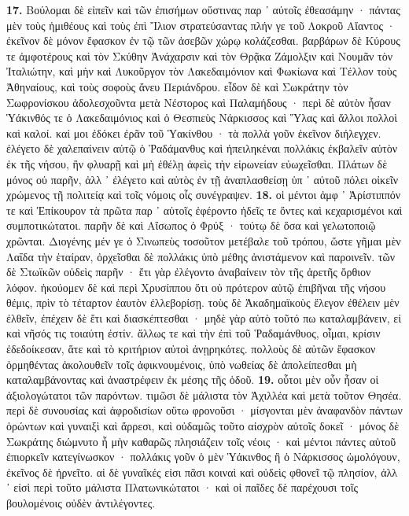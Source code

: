 \documentclass[a4paper, 11pt, oneside, polutonikogreek, german]{article}
\begin{document}
\textbf{17.} Βούλομαι δὲ εἰπεῖν καὶ τῶν ἐπισήμων οὕστινας παρ ᾽ αὐτοῖς ἐθεασάμην · πάντας μὲν τοὺς ἡμιθέους καὶ τοὺς ἐπὶ Ἴλιον στρατεύσαντας πλήν γε τοῦ Λοκροῦ Αἴαντος · ἐκεῖνον δὲ μόνον ἔφασκον ἐν τῷ τῶν ἀσεβῶν χώρῳ κολάζεσθαι. βαρβάρων δὲ Κύρους τε ἀμφοτέρους καὶ τὸν Σκύθην Ἀνάχαρσιν καὶ τὸν Θρᾷκα Ζάμολξιν καὶ Νουμᾶν τὸν Ἰταλιώτην, καὶ μὴν καὶ Λυκοῦργον τὸν Λακεδαιμόνιον καὶ Φωκίωνα καὶ Τέλλον τοὺς Ἀθηναίους, καὶ τοὺς σοφοὺς ἄνευ Περιάνδρου. εἶδον δὲ καὶ Σωκράτην τὸν Σωφρονίσκου ἀδολεσχοῦντα μετὰ Νέστορος καὶ Παλαμήδους · περὶ δὲ αὐτὸν ἦσαν Ὑάκινθός τε ὁ Λακεδαιμόνιος καὶ ὁ Θεσπιεὺς Νάρκισσος καὶ Ὕλας καὶ ἄλλοι πολλοὶ καὶ καλοί. καί μοι ἐδόκει ἐρᾶν τοῦ Ὑακίνθου · τὰ πολλὰ γοῦν ἐκεῖνον διήλεγχεν. ἐλέγετο δὲ χαλεπαίνειν αὐτῷ ὁ Ῥαδάμανθυς καὶ ἠπειληκέναι πολλάκις ἐκβαλεῖν αὐτὸν ἐκ τῆς νήσου, ἢν φλυαρῇ καὶ μὴ ἐθέλῃ ἀφεὶς τὴν εἰρωνείαν εὐωχεῖσθαι. Πλάτων δὲ μόνος οὐ παρῆν, ἀλλ ᾽ ἐλέγετο καὶ αὐτὸς ἐν τῇ ἀναπλασθείσῃ ὑπ ᾽ αὐτοῦ πόλει οἰκεῖν χρώμενος τῇ πολιτείᾳ καὶ τοῖς νόμοις οἷς συνέγραψεν. \textbf{18.} οἱ μέντοι ἀμφ ᾽ Ἀρίστιππόν τε καὶ Ἐπίκουρον τὰ πρῶτα παρ ᾽ αὐτοῖς ἐφέροντο ἡδεῖς τε ὄντες καὶ κεχαρισμένοι καὶ συμποτικώτατοι. παρῆν δὲ καὶ Αἴσωπος ὁ Φρύξ · τούτῳ δὲ ὅσα καὶ γελωτοποιῷ χρῶνται. Διογένης μέν γε ὁ Σινωπεὺς τοσοῦτον μετέβαλε τοῦ τρόπου, ὥστε γῆμαι μὲν Λαΐδα τὴν ἑταίραν, ὀρχεῖσθαι δὲ πολλάκις ὑπὸ μέθης ἀνιστάμενον καὶ παροινεῖν. τῶν δὲ Στωϊκῶν οὐδεὶς παρῆν · ἔτι γὰρ ἐλέγοντο ἀναβαίνειν τὸν τῆς ἀρετῆς ὄρθιον λόφον. ἠκούομεν δὲ καὶ περὶ Χρυσίππου ὅτι οὐ πρότερον αὐτῷ ἐπιβῆναι τῆς νήσου θέμις, πρὶν τὸ τέταρτον ἑαυτὸν ἐλλεβορίσῃ. τοὺς δὲ Ἀκαδημαϊκοὺς ἔλεγον ἐθέλειν μὲν ἐλθεῖν, ἐπέχειν δὲ ἔτι καὶ διασκέπτεσθαι · μηδὲ γὰρ αὐτὸ τοῦτό πω καταλαμβάνειν, εἰ καὶ νῆσός τις τοιαύτη ἐστίν. ἄλλως τε καὶ τὴν ἐπὶ τοῦ Ῥαδαμάνθυος, οἶμαι, κρίσιν ἐδεδοίκεσαν, ἅτε καὶ τὸ κριτήριον αὐτοὶ ἀνῃρηκότες. πολλοὺς δὲ αὐτῶν ἔφασκον ὁρμηθέντας ἀκολουθεῖν τοῖς ἀφικνουμένοις, ὑπὸ νωθείας δὲ ἀπολείπεσθαι μὴ καταλαμβάνοντας καὶ ἀναστρέφειν ἐκ μέσης τῆς ὁδοῦ. \textbf{19.} οὗτοι μὲν οὖν ἦσαν οἱ ἀξιολογώτατοι τῶν παρόντων. τιμῶσι δὲ μάλιστα τὸν Ἀχιλλέα καὶ μετὰ τοῦτον Θησέα. περὶ δὲ συνουσίας καὶ ἀφροδισίων οὕτω φρονοῦσι · μίσγονται μὲν ἀναφανδὸν πάντων ὁρώντων καὶ γυναιξὶ καὶ ἄρρεσι, καὶ οὐδαμῶς τοῦτο αἰσχρὸν αὐτοῖς δοκεῖ · μόνος δὲ Σωκράτης διώμνυτο ἦ μὴν καθαρῶς πλησιάζειν τοῖς νέοις · καὶ μέντοι πάντες αὐτοῦ ἐπιορκεῖν κατεγίνωσκον · πολλάκις γοῦν ὁ μὲν Ὑάκινθος ἢ ὁ Νάρκισσος ὡμολόγουν, ἐκεῖνος δὲ ἠρνεῖτο. αἱ δὲ γυναῖκές εἰσι πᾶσι κοιναὶ καὶ οὐδεὶς φθονεῖ τῷ πλησίον, ἀλλ ᾽ εἰσὶ περὶ τοῦτο μάλιστα Πλατωνικώτατοι · καὶ οἱ παῖδες δὲ παρέχουσι τοῖς βουλομένοις οὐδὲν ἀντιλέγοντες.
\end{document}
